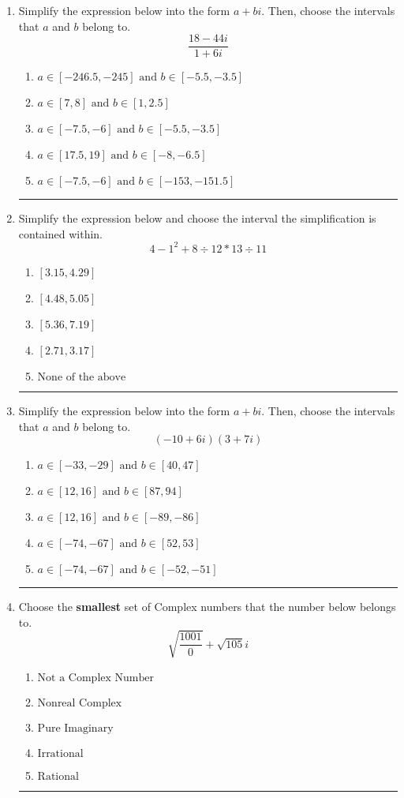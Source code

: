 \documentclass[14pt]{extbook}
\newcommand{\litem}[1]{\item#1\hspace*{-1cm}\rule{\textwidth}{0.4pt}}
\begin{document}
\begin{enumerate}
\litem{
Simplify the expression below into the form $a+bi$. Then, choose the intervals that $a$ and $b$ belong to.\[ \frac{18 - 44 i}{1 + 6 i} \]\begin{enumerate}[label=\Alph*.]
\item \( a \in [-246.5, -245] \text{ and } b \in [-5.5, -3.5] \)
\item \( a \in [7, 8] \text{ and } b \in [1, 2.5] \)
\item \( a \in [-7.5, -6] \text{ and } b \in [-5.5, -3.5] \)
\item \( a \in [17.5, 19] \text{ and } b \in [-8, -6.5] \)
\item \( a \in [-7.5, -6] \text{ and } b \in [-153, -151.5] \)

\end{enumerate} }
\litem{
Simplify the expression below and choose the interval the simplification is contained within.\[ 4 - 1^2 + 8 \div 12 * 13 \div 11 \]\begin{enumerate}[label=\Alph*.]
\item \( [3.15, 4.29] \)
\item \( [4.48, 5.05] \)
\item \( [5.36, 7.19] \)
\item \( [2.71, 3.17] \)
\item \( \text{None of the above} \)

\end{enumerate} }
\litem{
Simplify the expression below into the form $a+bi$. Then, choose the intervals that $a$ and $b$ belong to.\[ (-10 + 6 i)(3 + 7 i) \]\begin{enumerate}[label=\Alph*.]
\item \( a \in [-33, -29] \text{ and } b \in [40, 47] \)
\item \( a \in [12, 16] \text{ and } b \in [87, 94] \)
\item \( a \in [12, 16] \text{ and } b \in [-89, -86] \)
\item \( a \in [-74, -67] \text{ and } b \in [52, 53] \)
\item \( a \in [-74, -67] \text{ and } b \in [-52, -51] \)

\end{enumerate} }
\litem{
Choose the \textbf{smallest} set of Complex numbers that the number below belongs to.\[ \sqrt{\frac{1001}{0}}+\sqrt{105} i \]\begin{enumerate}[label=\Alph*.]
\item \( \text{Not a Complex Number} \)
\item \( \text{Nonreal Complex} \)
\item \( \text{Pure Imaginary} \)
\item \( \text{Irrational} \)
\item \( \text{Rational} \)


\end{enumerate}}
\end{enumerate}
\end{document}
